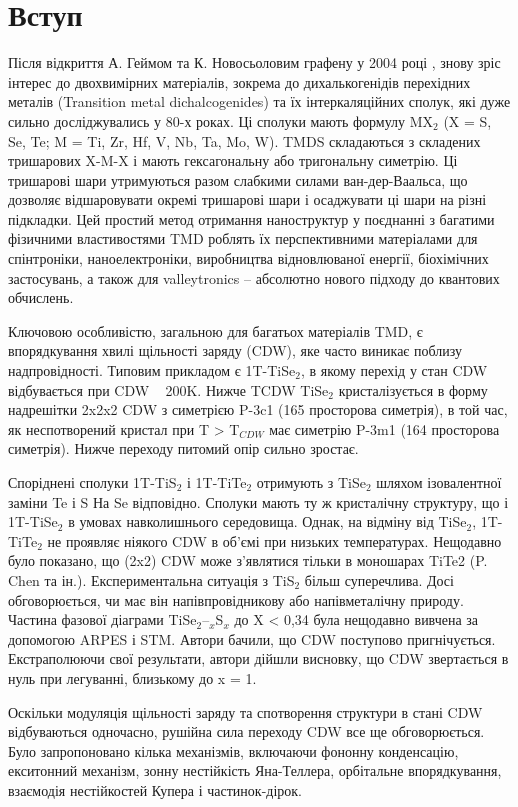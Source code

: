 \chapter{Вступ}
Після відкриття А. Геймом та К. Новосьоловим графену у 2004 році \cite{Graphene}, знову зріс інтерес до двохвимірних матеріалів, зокрема до дихалькогенідів перехідних металів (Transition metal dichalcogenides) та їх інтеркаляційних сполук, які дуже сильно досліджувались у 80-х роках. Ці сполуки мають формулу MX$_{2}$ (X = S, Se, Te; M = Ti, Zr, Hf, V, Nb, Ta, Mo, W). TMDS складаються з складених тришарових X-M-X і мають гексагональну або тригональну симетрію. Ці тришарові шари утримуються разом слабкими силами ван-дер-Ваальса, що дозволяє відшаровувати окремі тришарові шари і осаджувати ці шари на різні підкладки. Цей простий метод отримання наноструктур у поєднанні з багатими фізичними властивостями TMD роблять їх перспективними матеріалами для спінтроніки, наноелектроніки, виробництва відновлюваної енергії, біохімічних застосувань, а також для valleytronics – абсолютно нового підходу до квантових обчислень.

Ключовою особливістю, загальною для багатьох матеріалів TMD, є впорядкування хвилі щільності заряду (CDW), яке часто виникає поблизу надпровідності. Типовим прикладом є 1T-TiSe$_2$, в якому перехід у стан CDW відбувається при CDW ~ 200K. Нижче TCDW TiSe$_2$ кристалізується в форму надрешітки 2x2x2 CDW з симетрією P-3c1 (165 просторова симетрія), в той час, як неспотворений кристал при T > T$_{CDW}$ має симетрію P-3m1 (164 просторова симетрія). Нижче переходу питомий опір сильно зростає.

Споріднені сполуки 1T-TiS$_2$ і 1T-TiTe$_2$ отримують з TiSe$_2$ шляхом ізовалентної заміни Te і S На Se відповідно. Сполуки мають ту ж кристалічну структуру, що і 1T-TiSe$_2$ в умовах навколишнього середовища. Однак, на відміну від TiSe$_2$, 1T-TiTe$_2$ не проявляє ніякого CDW в об'ємі при низьких температурах. Нещодавно було показано, що (2x2) CDW може з'являтися тільки в моношарах TiTe2 (P. Chen та ін.). Експериментальна ситуація з TiS$_2$ більш суперечлива. Досі обговорюється, чи має він напівпровідникову або напівметалічну природу. Частина фазової діаграми TiSe$_2$--$_x$S$_x$ до X < 0,34 була нещодавно вивчена за допомогою ARPES і STM. Автори бачили, що CDW поступово пригнічується. Екстраполюючи свої результати, автори дійшли висновку, що CDW звертається в нуль при легуванні, близькому до x = 1.

Оскільки модуляція щільності заряду та спотворення структури в стані CDW відбуваються одночасно, рушійна сила переходу CDW все ще обговорюється. Було запропоновано кілька механізмів, включаючи фононну конденсацію, екситонний механізм, зонну нестійкість Яна-Теллера, орбітальне впорядкування, взаємодія нестійкостей Купера і частинок-дірок.

